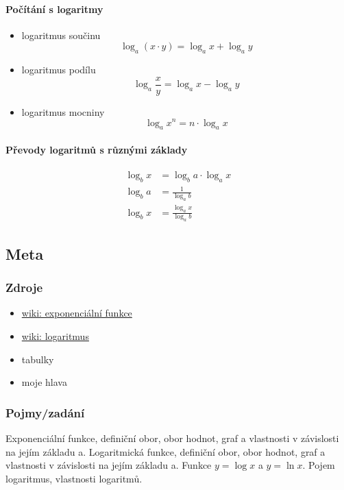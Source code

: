 \documentclass[12pt]{article}
\begin{document}
\paragraph{Počítání s logaritmy}
\begin{itemize}
\item logaritmus součinu
\begin{equation}
\log_a \left( x \cdot y\right) = \log_a x + \log_a y
\end{equation}
\item logaritmus podílu 
\begin{equation}
\log_a{\frac{x}{y}} = \log_a{x} - \log_a{y}
\end{equation}
\item logaritmus mocniny
\begin{equation}
\log_a{x^n} = n \cdot \log_a{x}
\end{equation}
\end{itemize}
\paragraph{Převody logaritmů s různými základy}
\begin{align}
\log_b x &= \log_b{a} \cdot\log_a{x}\\
\log_b{a} &= \frac{1}{\log_a{b}}\\
\log_b{x} &= \frac{\log_a{x}}{\log_a{b}}
\end{align}
\subsection{Meta}
\subsubsection{Zdroje}
\begin{itemize}
\item \href{https://cs.wikipedia.org/wiki/Exponenci\%C3\%A1ln\%C3\%AD_funkce}{wiki: exponenciální funkce}
\item \href{https://cs.wikipedia.org/wiki/Logaritmus}{wiki: logaritmus}
\item tabulky
\item moje hlava
\end{itemize}
\subsubsection{Pojmy/zadání}
Exponenciální funkce, definiční obor, obor hodnot, graf a vlastnosti v závislosti na jejím základu a. Logaritmická funkce, definiční obor, obor hodnot, graf a vlastnosti v závislosti na jejím základu a. Funkce $y = \log x$	 a $y =\ln x$. Pojem logaritmus, vlastnosti logaritmů.
\end{document}
